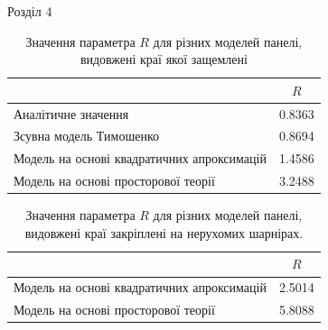 \documentclass[8pt]{beamer}
\numberwithin{figure}{section}
\numberwithin{equation}{section}
\numberwithin{table}{section}
\begin{document}
\begin{frame}{Розділ 4}
\begin{table}[h!]
\centering
 \begin{tabular}{| l | c |} 
 \hline
 & $R$ \\ 
 \hline
 Аналітичне значення\footnotemark & 0.8363 \\ 
 \hline
 Зсувна модель Тимошенко & 0.8694 \\ 
 \hline
 Модель на основі квадратичних апроксимацій & 1.4586 \\ 
 \hline
 Модель на основі просторової теорії & 3.2488 \\
 \hline
\end{tabular}
\caption{Значення параметра $R$ для різних моделей панелі, видовжені краї якої защемлені}
\label{table:1}
\end{table}

\begin{table}[h!]
\centering
 \begin{tabular}{| l | c |} 
 \hline
 & $R$ \\ 
 \hline
 Модель на основі квадратичних апроксимацій & 2.5014 \\ 
 \hline
 Модель на основі просторової теорії & 5.8088 \\
 \hline
\end{tabular}
\caption{Значення параметра $R$ для різних моделей панелі, видовжені краї закріплені на нерухомих шарнірах.}
\label{table:1}
\end{table}


\end{frame}
\end{document}
